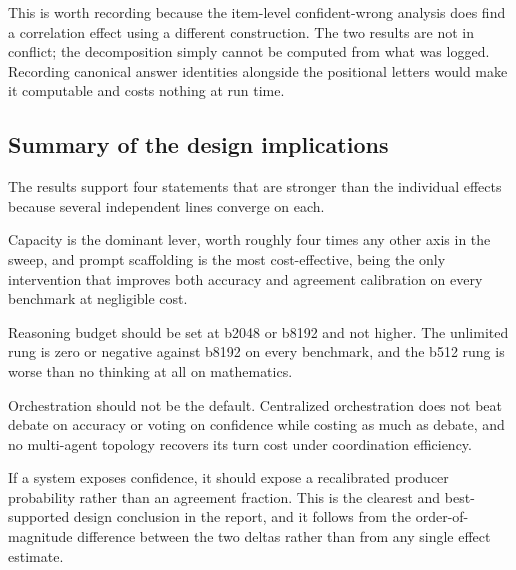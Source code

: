 This is worth recording because the item-level confident-wrong analysis does find a
correlation effect using a different construction. The two results are not in conflict; the
decomposition simply cannot be computed from what was logged. Recording canonical answer
identities alongside the positional letters would make it computable and costs nothing at
run time.

\subsection{Summary of the design implications}

The results support four statements that are stronger than the individual effects because
several independent lines converge on each.

Capacity is the dominant lever, worth roughly four times any other axis in the sweep, and
prompt scaffolding is the most cost-effective, being the only intervention that improves
both accuracy and agreement calibration on every benchmark at negligible cost.

Reasoning budget should be set at b2048 or b8192 and not higher. The unlimited rung is zero
or negative against b8192 on every benchmark, and the b512 rung is worse than no thinking at
all on mathematics.

Orchestration should not be the default. Centralized orchestration does not beat debate on
accuracy or voting on confidence while costing as much as debate, and no multi-agent topology
recovers its turn cost under coordination efficiency.

If a system exposes confidence, it should expose a recalibrated producer probability rather
than an agreement fraction. This is the clearest and best-supported design conclusion in the
report, and it follows from the order-of-magnitude difference between the two deltas rather
than from any single effect estimate.
